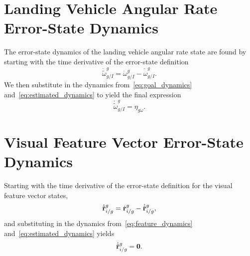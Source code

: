 \section{Landing Vehicle Angular Rate Error-State Dynamics}
The error-state dynamics of the landing vehicle angular rate state are found by
starting with the time derivative of the error-state definition
\begin{equation}
  \dot{\tilde{\omega}}_{g/I}^g = \dot{\omega}_{g/I}^g -
  \dot{\hat{\omega}}_{g/I}^g.
\end{equation}
We then substitute in the dynamics from~\eqref{eq:goal_dynamics}
and~\eqref{eq:estimated_dynamics} to yield the final expression
\begin{equation}
  \dot{\tilde{\omega}}_{g/I}^g = \eta_{g\omega}. 
\end{equation}

\section{Visual Feature Vector Error-State Dynamics}
Starting with the time derivative of the error-state definition for the visual
feature vector states,
\begin{equation}
  \dot{\tilde{\boldsymbol{\mathrm{r}}}}_{i/g}^g = \dot{\boldsymbol{\mathrm{r}}}_{i/g}^g  -
  \dot{\hat{\boldsymbol{\mathrm{r}}}}_{i/g}^g,
\end{equation}
and substituting in the dynamics from~\eqref{eq:feature_dynamics}
and~\eqref{eq:estimated_dynamics} yields
\begin{equation}
  \dot{\tilde{\boldsymbol{\mathrm{r}}}}_{i/g}^g = \boldsymbol{\mathrm{0}}.
\end{equation}

